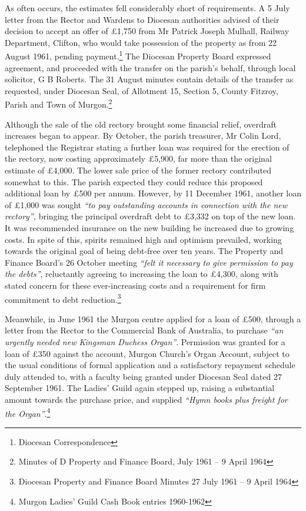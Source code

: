 As often occurs, the estimates fell considerably short of requirements. A 5 July letter from the Rector and Wardens to Diocesan authorities advised of their decision to accept an offer of £1,750 from Mr Patrick Joseph Mulhall, Railway Department, Clifton, who would take possession of the property as from 22 August 1961, pending payment.\footnote{Diocesan Correspondence} The Diocesan Property Board expressed agreement, and proceeded with the transfer on the parish's behalf, through local solicitor, G B Roberts. The 31 August minutes contain details of the transfer as requested, under Diocesan Seal, of Allotment 15, Section 5, County Fitzroy, Parish and Town of Murgon.\footnote{Minutes of D Property and Finance Board, July 1961 -- 9 April 1964}

Although the sale of the old rectory brought some financial relief, overdraft increases began to appear. By October, the parish treasurer, Mr Colin Lord, telephoned the Registrar stating a further loan was required for the erection of the rectory, now costing approximately £5,900, far more than the original estimate of £4,000. The lower sale price of the former rectory contributed somewhat to this. The parish expected they could reduce this proposed additional loan by £500 per annum. However, by 11 December 1961, another loan of £1,000 was sought \emph{``to pay outstanding accounts in connection with the new rectory'',} bringing the principal overdraft debt to £3,332 on top of the new loan. It was recommended insurance on the new building be increased due to growing costs. In spite of this, spirits remained high and optimism prevailed, working towards the original goal of being debt-free over ten years. The Property and Finance Board's 26 October meeting \emph{``felt it necessary to give permission to pay the debts''}, reluctantly agreeing to increasing the loan to £4,300, along with stated concern for these ever-increasing costs and a requirement for firm commitment to debt reduction.\footnote{Diocesan Property and Finance Board Minutes 27 July 1961 -- 9 April 1964}

Meanwhile, in June 1961 the Murgon centre applied for a loan of £500, through a letter from the Rector to the Commercial Bank of Australia, to purchase \emph{``an urgently needed new Kingsman Duchess Organ''}. Permission was granted for a loan of £350 against the account, Murgon Church's Organ Account, subject to the usual conditions of formal application and a satisfactory repayment schedule duly attended to, with a faculty being granted under Diocesan Seal dated 27 September 1961. The Ladies' Guild again stepped up, raising a substantial amount towards the purchase price, and supplied \emph{``Hymn books plus freight for the Organ''}.\footnote{Murgon Ladies' Guild Cash Book entries 1960-1962}

